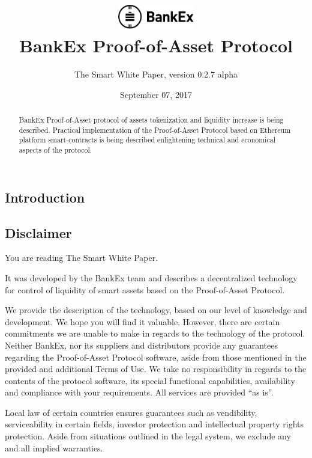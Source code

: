 \documentclass{article}
\title{\vspace{-3.85em}\includegraphics[width=0.25\textwidth]{logo.pdf} \\ \vspace{24pt} BankEx Proof-of-Asset Protocol}
\author{The Smart White Paper, version 0.2.7 alpha}
\date{September 07, 2017}
\begin{document}
\maketitle

\begin{abstract}
BankEx Proof-of-Asset protocol of assets tokenization and liquidity increase is being described. Practical implementation of the Proof-of-Asset Protocol based on Ethereum platform smart-contracts is being described enlightening technical and economical aspects of the protocol.
\end{abstract}

\vspace{24pt}

\begin{multicols}{2}

\tableofcontents

\section{Introduction}

\subsection{Disclaimer}

You are reading The Smart White Paper.

It was developed by the BankEx team and describes a decentralized technology for control of liquidity of smart assets based on the Proof-of-Asset Protocol.
	
We provide the description of the technology, based on our level of knowledge and development. We hope you will find it valuable. However, there are certain commitments we are unable to make in regards to the technology of the protocol.  
Neither BankEx, nor its suppliers and distributors provide any guarantees regarding the Proof-of-Asset Protocol software, aside from those mentioned in the provided and additional Terms of Use. We take no responsibility in regards to the contents of the protocol software, its special functional capabilities, availability and compliance with your requirements. All services are provided \enquote{as is}.

Local law of certain countries ensures guarantees such as vendibility, serviceability in certain fields, investor protection and intellectual property rights protection. Aside from situations outlined in the legal system, we exclude any and all implied warranties.


\end{multicols}
\end{document}
